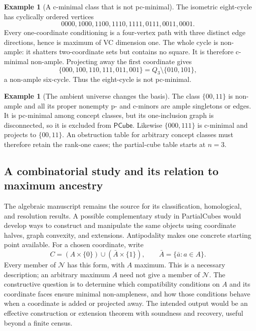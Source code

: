 \documentclass[11pt]{article}
\theoremstyle{definition}
\newtheorem{example}[proposition]{Example}
\newcommand{\PCube}{\mathsf{PCube}}
\begin{document}
\begin{example}[A c-minimal class that is not pc-minimal]\label{ex:cycle}
The isometric eight-cycle has cyclically ordered vertices
\[
 0000,1000,1100,1110,1111,0111,0011,0001.
\]
Every one-coordinate conditioning is a four-vertex path with three distinct
edge directions, hence is maximum of VC dimension one. The whole cycle is
non-ample: it shatters two-coordinate sets but contains no square. It is
therefore c-minimal non-ample. Projecting away the first coordinate gives
\[
 \{000,100,110,111,011,001\}=Q_3\setminus\{010,101\},
\]
a non-ample six-cycle. Thus the eight-cycle is not pc-minimal.
\end{example}

\begin{example}[The ambient universe changes the basis]\label{ex:ambient}
The class $\{00,11\}$ is non-ample and all its proper nonempty p- and
c-minors are ample singletons or edges. It is pc-minimal among concept
classes, but its one-inclusion graph is disconnected, so it is excluded
from $\PCube$. Likewise $\{000,111\}$ is c-minimal and projects to
$\{00,11\}$. An obstruction table for arbitrary concept classes must
therefore retain the rank-one cases; the partial-cube table starts at $n=3$.
\end{example}

\subsection{A combinatorial study and its relation to maximum ancestry}
\label{sec:nonample-study}

The algebraic manuscript remains the source for its classification,
homological, and resolution results. A possible complementary study in
PartialCubes would develop ways to construct and manipulate the same objects
using coordinate halves, graph convexity, and extensions. Antipodality makes
one concrete starting point available. For a chosen coordinate, write
\[
 C=(A\times\{0\})\cup(\bar A\times\{1\}),
 \qquad \bar A=\{\bar a:a\in A\}.
\]
Every member of $\mathcal N$ has this form, with $A$ maximum. This is a
necessary description; an arbitrary maximum $A$ need not give a member of
$\mathcal N$. The constructive question is to determine which compatibility
conditions on $A$ and its coordinate faces ensure minimal non-ampleness,
and how those conditions behave when a coordinate is added or projected
away. The intended output would be an effective construction or extension
theorem with soundness and recovery, useful beyond a finite census.
\end{document}
